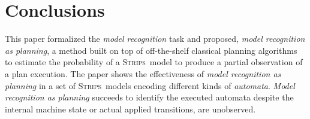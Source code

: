 \documentclass[letterpaper]{article} %
\newcommand{\strips}{\textsc{Strips}}     %
\begin{document}
\section{Conclusions}
\label{sec:conclussions}
This paper formalized the {\em model recognition} task and proposed, {\em model recognition as planning}, a method built on top of off-the-shelf classical planning algorithms to estimate the probability of a \strips\ model to produce a partial observation of a plan execution. The paper shows the effectiveness of {\em model recognition as planning} in a set of \strips\ models encoding different kinds of {\em automata}. {\em Model recognition as planning} succeeds to identify the executed automata despite the internal machine state or actual applied transitions, are unobserved.







\newpage



\end{document}
